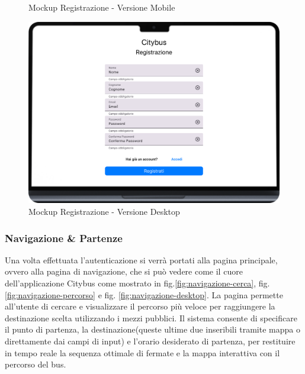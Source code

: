 \begin{figure}[H]
\begin{minipage}[b]{0.25\textwidth}
    \caption{Mockup Registrazione - Versione Mobile}
    \label{fig:registrazione-mobile}
  \end{minipage}
  \hfill
  \begin{minipage}[b]{0.68\textwidth}
    \centering
    \includegraphics[width=\textwidth]{images/mockup/Registrazione Desktop.png}
    \caption{Mockup Registrazione - Versione Desktop}
    \label{fig:registrazione-desktop}
  \end{minipage}
\end{figure}

\subsubsection{Navigazione \& Partenze}

Una volta effettuata l'autenticazione si verrà portati alla pagina principale, ovvero alla pagina di navigazione, che si può vedere come il cuore dell'applicazione Citybus come mostrato in fig.\ref{fig:navigazione-cerca}, fig.\ref{fig:navigazione-percorso} e fig. \ref{fig:navigazione-desktop}.
La pagina permette all’utente di cercare e visualizzare il percorso più veloce per raggiungere la destinazione scelta utilizzando i mezzi pubblici. Il sistema consente di specificare il punto di partenza, la destinazione(queste ultime due inseribili tramite mappa o direttamente dai campi di input) e l’orario desiderato di partenza, per restituire in tempo reale la sequenza ottimale di fermate e la mappa interattiva con il percorso del bus.


